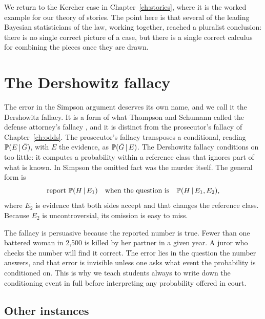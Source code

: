 We return to the Kercher case in Chapter~\ref{ch:stories}, where it is the worked example for our theory of stories. The point here is that several of the leading Bayesian statisticians of the law, working together, reached a pluralist conclusion: there is no single correct picture of a case, but there is a single correct calculus for combining the pieces once they are drawn.

\section{The Dershowitz fallacy}

The error in the Simpson argument deserves its own name, and we call it the Dershowitz fallacy. It is a form of what Thompson and Schumann called the defense attorney's fallacy \citep{thompson1987}, and it is distinct from the prosecutor's fallacy of Chapter~\ref{ch:odds}. The prosecutor's fallacy transposes a conditional, reading $\mathbb{P}(E\,\vert\, \bar G)$, with $E$ the evidence, as $\mathbb{P}(\bar G\,\vert\, E)$. The Dershowitz fallacy conditions on too little: it computes a probability within a reference class that ignores part of what is known. In Simpson the omitted fact was the murder itself. The general form is
\[
\text{report } \mathbb{P}(H\,\vert\, E_1) \quad\text{when the question is}\quad \mathbb{P}(H \,\vert\, E_1, E_2),
\]
where $E_2$ is evidence that both sides accept and that changes the reference class. Because $E_2$ is uncontroversial, its omission is easy to miss.

The fallacy is persuasive because the reported number is true. Fewer than one battered woman in 2,500 is killed by her partner in a given year. A juror who checks the number will find it correct. The error lies in the question the number answers, and that error is invisible unless one asks what event the probability is conditioned on. This is why we teach students always to write down the conditioning event in full before interpreting any probability offered in court.

\subsection{Other instances}

